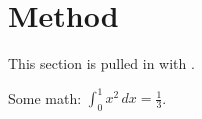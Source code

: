 \section{Method}

This section is pulled in with \verb||.

Some math: $\int_0^1 x^2 \, dx = \tfrac{1}{3}$.
